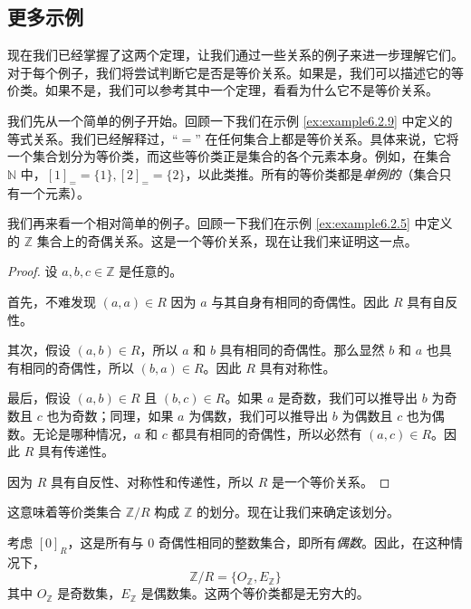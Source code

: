 
\subsection{更多示例}

现在我们已经掌握了这两个定理，让我们通过一些关系的例子来进一步理解它们。对于每个例子，我们将尝试判断它是否是等价关系。如果是，我们可以描述它的等价类。如果不是，我们可以参考其中一个定理，看看为什么它不是等价关系。\\

\begin{example}
    我们先从一个简单的例子开始。回顾一下我们在示例 \ref{ex:example6.2.9} 中定义的等式关系。我们已经解释过，``$=$'' 在任何集合上都是等价关系。具体来说，它将一个集合划分为等价类，而这些等价类正是集合的各个元素本身。例如，在集合 $\mathbb{N}$ 中，$[1]_{=} = \{1\}, [2]_{=} = \{2\}$，以此类推。所有的等价类都是\emph{单例的}（集合只有一个元素）。
\end{example}

\begin{example}
    我们再来看一个相对简单的例子。回顾一下我们在示例 \ref{ex:example6.2.5} 中定义的 $\mathbb{Z}$ 集合上的奇偶关系。这是一个等价关系，现在让我们来证明这一点。
    \begin{proof}
        设 $a, b, c \in \mathbb{Z}$ 是任意的。

        首先，不难发现 $(a,a) \in R$ 因为 $a$ 与其自身有相同的奇偶性。因此 $R$ 具有自反性。

        其次，假设 $(a,b) \in R$，所以 $a$ 和 $b$ 具有相同的奇偶性。那么显然 $b$ 和 $a$ 也具有相同的奇偶性，所以 $(b,a) \in R$。因此 $R$ 具有对称性。

        最后，假设 $(a,b) \in R$ 且 $(b,c) \in R$。如果 $a$ 是奇数，我们可以推导出 $b$ 为奇数且 $c$ 也为奇数；同理，如果 $a$ 为偶数，我们可以推导出 $b$ 为偶数且 $c$ 也为偶数。无论是哪种情况，$a$ 和 $c$ 都具有相同的奇偶性，所以必然有 $(a,c) \in R$。因此 $R$ 具有传递性。

        因为 $R$ 具有自反性、对称性和传递性，所以 $R$ 是一个等价关系。
    \end{proof}

    这意味着等价类集合 $\mathbb{Z}/R$ 构成 $\mathbb{Z}$ 的划分。现在让我们来确定该划分。

    考虑 $[0]_R$，这是所有与 $0$ 奇偶性相同的整数集合，即所有\emph{偶数}。因此，在这种情况下，
    \[\mathbb{Z}/R = \{O_{\mathbb{Z}}, E_{\mathbb{Z}}\}\]
    其中 $O_{\mathbb{Z}}$ 是奇数集，$E_{\mathbb{Z}}$ 是偶数集。这两个等价类都是无穷大的。
\end{example}

